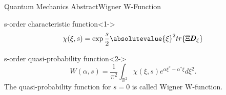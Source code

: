 \begin{frame}{Quantum Mechanics Abstract}{Wigner W-Function}
    \begin{block}{s-order characteristic function}<1->
        \begin{equation*}
            \mathcal{\chi}(\xi,s)=\exp{\frac{s}{2}\absolutevalue{\xi}^2}
            tr\{\pmb{\Xi}\pmb{D}_\xi\}
        \end{equation*}
    
    \end{block}
    \begin{block}{s-order quasi-probability function}<2->
        \begin{equation*}
            W(\alpha,s)=\frac{1}{\pi^2}\int_{\mathbb{R}^2} 
            \mathcal{\chi}(\xi,s)e^{\alpha\xi^*-\alpha^*\xi}d\xi^2.
        \end{equation*}
        The quasi-probability function for $s=0$ is called Wigner W-function.
    \end{block}
    \ \\ \mbox{} \\
\end{frame}